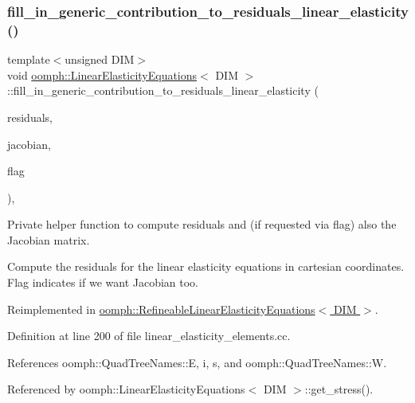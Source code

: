 \subsubsection{\texorpdfstring{fill\+\_\+in\+\_\+generic\+\_\+contribution\+\_\+to\+\_\+residuals\+\_\+linear\+\_\+elasticity()}{fill\_in\_generic\_contribution\_to\_residuals\_linear\_elasticity()}}
{\footnotesize\ttfamily template$<$unsigned D\+IM$>$ \\
void \hyperlink{classoomph_1_1LinearElasticityEquations}{oomph\+::\+Linear\+Elasticity\+Equations}$<$ D\+IM $>$\+::fill\+\_\+in\+\_\+generic\+\_\+contribution\+\_\+to\+\_\+residuals\+\_\+linear\+\_\+elasticity (\begin{DoxyParamCaption}\item[{\hyperlink{classoomph_1_1Vector}{Vector}$<$ double $>$ \&}]{residuals,  }\item[{\hyperlink{classoomph_1_1DenseMatrix}{Dense\+Matrix}$<$ double $>$ \&}]{jacobian,  }\item[{unsigned}]{flag }\end{DoxyParamCaption})\hspace{0.3cm}{\ttfamily [private]}, {\ttfamily [virtual]}}



Private helper function to compute residuals and (if requested via flag) also the Jacobian matrix. 

Compute the residuals for the linear elasticity equations in cartesian coordinates. Flag indicates if we want Jacobian too. 

Reimplemented in \hyperlink{classoomph_1_1RefineableLinearElasticityEquations_ae2f77382b9fdb12eb7b4ba0dc6c239ef}{oomph\+::\+Refineable\+Linear\+Elasticity\+Equations$<$ D\+I\+M $>$}.



Definition at line 200 of file linear\+\_\+elasticity\+\_\+elements.\+cc.



References oomph\+::\+Quad\+Tree\+Names\+::E, i, s, and oomph\+::\+Quad\+Tree\+Names\+::W.



Referenced by oomph\+::\+Linear\+Elasticity\+Equations$<$ D\+I\+M $>$\+::get\+\_\+stress().

\mbox{\label{classoomph_1_1LinearElasticityEquations_a9d3ccf59b001a53e53e74a1ae429d6b7}} 
